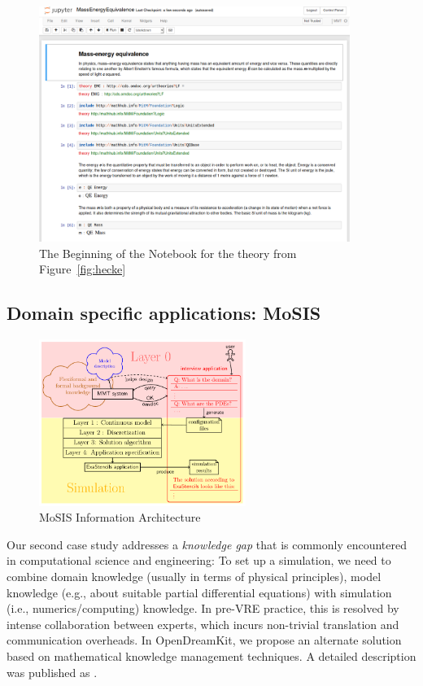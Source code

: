 \begin{figure}[ht]\centering
  \includegraphics[width=0.9\textwidth]{screenshots/emc}
  \caption{The Beginning of the Notebook for the theory from Figure~\ref{fig:hecke}}\label{fig:lmfdbexample}
\end{figure}

\subsection{Domain specific applications: MoSIS}

\begin{figure}[ht]\centering
  \includegraphics[width=0.6\textwidth]{../D4.11/proto}
  \caption{MoSIS Information Architecture}\label{fig:prototype}
\end{figure}

Our second case study addresses a \emph{knowledge gap} that is commonly encountered in computational science and engineering:
To set up a simulation, we need to combine domain knowledge (usually in terms of physical principles), model knowledge (e.g., about suitable partial differential equations) with simulation (i.e., numerics/computing) knowledge.
In pre-VRE practice, this is resolved by intense collaboration between experts, which incurs non-trivial translation and communication overheads.
In OpenDreamKit, we propose an alternate solution based on mathematical knowledge management techniques.
A detailed description was published as \cite{PolKohKoe:kacse18}.

